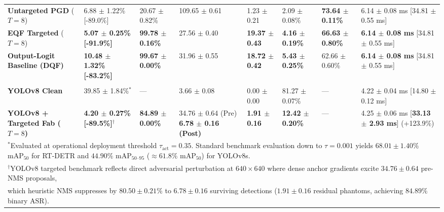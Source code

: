 \documentclass[preprint,12pt]{elsarticle}
\begin{document}
\begin{table}[!htbp]
{\begin{tabular}{l l l l l l l l}
\addlinespace[4pt]
\textbf{Untargeted PGD} ($T=8$) & 6.88 $\pm$ 1.22\% [-89.0\%] & 20.67 $\pm$ 0.82\% & 109.65 $\pm$ 0.61 & 1.23 $\pm$ 0.21 & 2.09 $\pm$ 0.08\% & \textbf{73.64 $\pm$ 0.11\%} & 6.14 $\pm$ 0.08 ms [34.81 $\pm$ 0.55 ms] \\
\addlinespace[4pt]
\textbf{EQF Targeted} ($T=8$) & \textbf{5.07 $\pm$ 0.25\% [-91.9\%]} & \textbf{99.78 $\pm$ 0.16\%} & 27.56 $\pm$ 0.40 & \textbf{19.37 $\pm$ 0.43} & \textbf{4.16 $\pm$ 0.19\%} & \textbf{66.63 $\pm$ 0.80\%} & \textbf{6.14 $\pm$ 0.08 ms} [34.81 $\pm$ 0.55 ms] \\
\addlinespace[4pt]
\textbf{Output-Logit Baseline (DQF)} & \textbf{10.48 $\pm$ 1.32\% [-83.2\%]} & \textbf{99.67 $\pm$ 0.00\%} & 31.96 $\pm$ 0.55 & \textbf{18.72 $\pm$ 0.42} & \textbf{5.43 $\pm$ 0.25\%} & 62.66 $\pm$ 0.60\% & \textbf{6.14 $\pm$ 0.08 ms} [34.81 $\pm$ 0.55 ms] \\
\addlinespace[6pt]
\midrule
\addlinespace[6pt]
\multicolumn{8}{l}{\textit{\textbf{YOLOv8-Small Baseline (Anchor-Free Convolutional + Heuristic NMS, Native $640\times 640$)}}} \\
\textbf{YOLOv8 Clean} & 39.85 $\pm$ 1.84\%$^*$ & --- & 3.66 $\pm$ 0.08 & 0.00 $\pm$ 0.00 & 81.27 $\pm$ 0.07\% & --- & 4.22 $\pm$ 0.04 ms [14.80 $\pm$ 0.12 ms] \\
\addlinespace[4pt]
\textbf{YOLOv8 + Targeted Fab ($T=8$)} & \textbf{4.20 $\pm$ 0.27\% [-89.5\%]}$^\dagger$ & \textbf{84.89 $\pm$ 0.00\%} & \makecell[l]{34.76 $\pm$ 0.64 (Pre)\\\textbf{6.78 $\pm$ 0.16 (Post)}} & \textbf{1.91 $\pm$ 0.16} & \textbf{12.42 $\pm$ 0.20\%} & --- & 4.25 $\pm$ 0.06 ms [\textbf{33.13 $\pm$ 2.93 ms}] (+123.9\%) \\
\bottomrule
\multicolumn{8}{l}{\footnotesize{$^*$Evaluated at operational deployment threshold $\tau_{\mathrm{act}}=0.35$. Standard benchmark evaluation down to $\tau=0.001$ yields $68.01 \pm 1.40\%$ $\mathrm{mAP}_{50}$ for RT-DETR and $44.90\%$ $\mathrm{mAP}_{50\text{--}95}$ ($\approx 61.8\%$ $\mathrm{mAP}_{50}$) for YOLOv8s.}} \\
\multicolumn{8}{l}{\footnotesize{$^\dagger$YOLOv8 targeted benchmark reflects direct adversarial perturbation at $640\times 640$ where dense anchor gradients excite $34.76 \pm 0.64$ pre-NMS proposals,}} \\
\multicolumn{8}{l}{\footnotesize{which heuristic NMS suppresses by $80.50 \pm 0.21\%$ to $6.78 \pm 0.16$ surviving detections ($1.91 \pm 0.16$ residual phantoms, achieving $84.89\%$ binary ASR).}}
\end{tabular}%
}
\end{table}
\end{document}
